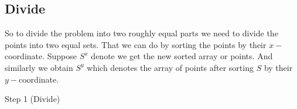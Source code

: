 \subsection{Divide}  So to divide the problem into two roughly equal parts we need to divide the points into two equal sets. That we can do by sorting the points by their $x-$coordinate. Suppose $S^x$ denote we get the new sorted array or points. And similarly we obtain $S^y$ which denotes the array of points after sorting $S$ by their $y-$coordinate.
\begin{center}
    \begin{minipage}{0.6\textwidth}
        \begin{algorithm}[H]
            \DontPrintSemicolon
            \caption{Step 1 (Divide)}
        \end{algorithm}
        
    \end{minipage}
    \hspace{5mm}
    \begin{minipage}{0.35\textwidth}


\begin{tikzpicture}[x=0.75pt,y=0.75pt,yscale=-1,xscale=1]


\end{tikzpicture}
\end{minipage}
\end{center}
